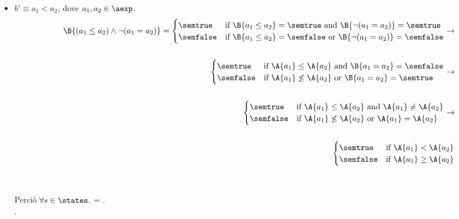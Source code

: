 {\begin{enumerate}[label=(\alph*)]
\begin{itemize}
    \item $ b' \equiv a_1 < a_2$, dove $a_1, a_2 \in \aexp$. \\
      \begin{align*}
        \B{(a_1 \leq a_2) \land \lnot(a_1 = a_2)} = 
        \begin{cases}
        \semtrue &
        \mbox{if} \ \B{a_1 \leq a_2} = \semtrue
                    \mbox{ and }
                    \B{\lnot(a_1 = a_2)} = \semtrue \\
        \semfalse &
        \mbox{if} \ \B{a_1 \leq a_2} = \semfalse
                    \mbox{ or }
                    \B{\lnot(a_1 = a_2)} = \semfalse \\
        \end{cases}
        \rightarrow \\ \\
        \begin{cases}
        \semtrue &
        \mbox{if} \ \A{a_1} \leq \A{a_2}
                    \mbox{ and }
                    \B{a_1 = a_2} = \semfalse \\
        \semfalse &
        \mbox{if} \ \A{a_1} \not \leq \A{a_2}
                    \mbox{ or }
                    \B{a_1 = a_2} = \semtrue \\
        \end{cases}
        \rightarrow \\ \\
        \begin{cases}
        \semtrue &
        \mbox{if} \ \A{a_1} \leq \A{a_2}
                    \mbox{ and }
                    \A{a_1} \neq \A{a_2} \\
        \semfalse &
        \mbox{if} \ \A{a_1} \not \leq \A{a_2}
                    \mbox{ or }
                    \A{a_1} = \A{a_2} \\
        \end{cases}
        \rightarrow \\ \\
        \begin{cases}
        \semtrue &
        \mbox{if} \ \A{a_1} < \A{a_2} \\
        \semfalse &
        \mbox{if} \ \A{a_1} \geq \A{a_2} \\
        \end{cases}
      \end{align*} \\ \\
      Perciò $\forall s \in \states$. =
      . \\.


\end{itemize}
\end{enumerate}}
